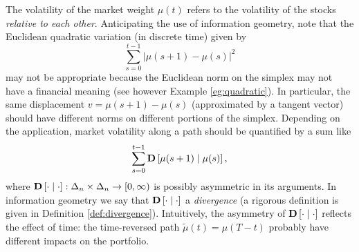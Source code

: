 \documentclass[graybox]{svmult}
\begin{document}
The volatility of the market weight $\mu(t)$ refers to the volatility of the stocks {\it relative to each other}. Anticipating the use of information geometry, note that the Euclidean quadratic variation (in discrete time) given by
\begin{equation} \label{eqn:quadratic variation}
\sum_{s = 0}^{t - 1} | \mu(s + 1) - \mu(s) |^2
\end{equation}
may not be appropriate because the Euclidean norm on the simplex may not have a financial meaning (see however Example \ref{eg:quadratic}). In particular, the same displacement $v = \mu(s + 1) - \mu(s)$ (approximated by a tangent vector) should have different norms on different portions of the simplex. Depending on the application, market volatility along a path should be quantified by a sum like
\[
\sum_{s = 0}^{t - 1} {\bf D}\left[ \mu(s + 1) \mid \mu(s) \right],
\]
where ${\bf D}\left[ \cdot \mid \cdot \right]: \Delta_n \times \Delta_n \rightarrow [0, \infty)$ is possibly asymmetric in its arguments. In information geometry we say that ${\bf D}\left[ \cdot \mid \cdot \right]$ a {\it divergence} (a rigorous definition is given in Definition \ref{def:divergence}). Intuitively, the asymmetry of ${\bf D}\left[ \cdot \mid \cdot \right]$ reflects the effect of time: the time-reversed path $\tilde{\mu}(t) = \mu(T - t)$ probably have different impacts on the portfolio. %
\end{document}
